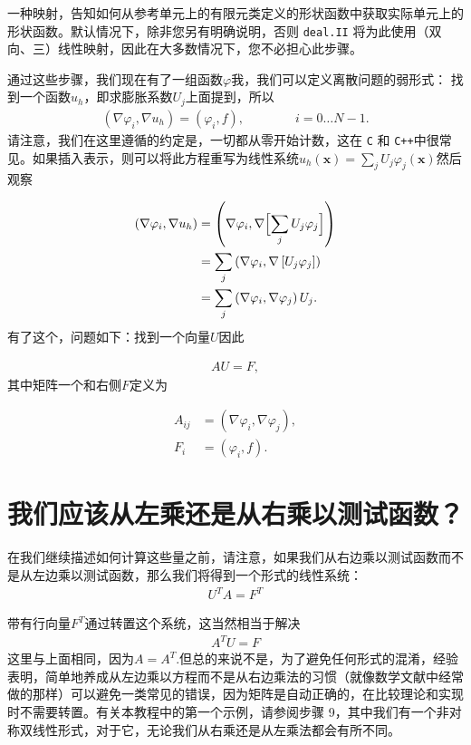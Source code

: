 \documentclass[12pt, a4paper]{article}
\numberwithin{equation}{section} %
\begin{document}
一种映射，告知如何从参考单元上的有限元类定义的形状函数中获取实际单元上的形状函数。默认情况下，除非您另有明确说明，否则 \verb|deal.II| 将为此使用（双向、三）线性映射，因此在大多数情况下，您不必担心此步骤。


通过这些步骤，我们现在有了一组函数$\varphi$我，我们可以定义离散问题的弱形式： 找到一个函数$u_h$，即求膨胀系数$U_j$上面提到，所以
\begin{align*} (\nabla\varphi_i, \nabla u_h) = (\varphi_i, f), \qquad\qquad i=0\ldots N-1. \end{align*}
请注意，我们在这里遵循的约定是，一切都从零开始计数，这在 \verb|C| 和 \verb|C++|中很常见。如果插入表示，则可以将此方程重写为线性系统$u_h(\mathbf x)=\sum_j U_j \varphi_j(\mathbf x)$然后观察

\begin{align*} 
(\nabla\varphi_i, \nabla u_h) &= \left(\nabla\varphi_i, \nabla \Bigl[\sum_j U_j \varphi_j\Bigr]\right) \\ 
&= \sum_j \left(\nabla\varphi_i, \nabla \left[U_j \varphi_j\right]\right) \\
 &= \sum_j \left(\nabla\varphi_i, \nabla \varphi_j \right) U_j. 
\end{align*}
有了这个，问题如下：找到一个向量$U$因此

\begin{align*} A U = F, \end{align*}
其中矩阵一个和右侧$F$定义为

\begin{align*} A_{ij} &= (\nabla\varphi_i, \nabla \varphi_j), \\ F_i &= (\varphi_i, f). \end{align*}


\newpage
\section{我们应该从左乘还是从右乘以测试函数？}

在我们继续描述如何计算这些量之前，请注意，如果我们从右边乘以测试函数而不是从左边乘以测试函数，那么我们将得到一个形式的线性系统：
\begin{align*} U^T A = F^T \end{align*}

带有行向量$F^T$通过转置这个系统，这当然相当于解决
\begin{align*} A^T U = F \end{align*}
这里与上面相同，因为$A = A^T$.但总的来说不是，为了避免任何形式的混淆，经验表明，简单地养成从左边乘以方程而不是从右边乘法的习惯（就像数学文献中经常做的那样）可以避免一类常见的错误，因为矩阵是自动正确的，在比较理论和实现时不需要转置。有关本教程中的第一个示例，请参阅步骤 9，其中我们有一个非对称双线性形式，对于它，无论我们从右乘还是从左乘法都会有所不同。
\end{document}
